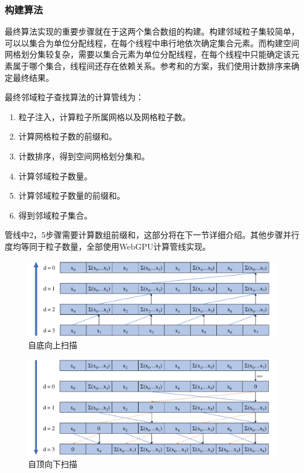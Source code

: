 \subsubsection{构建算法}
    最终算法实现的重要步骤就在于这两个集合数组的构建。构建邻域粒子集较简单，可以以集合为单位分配线程，在每个线程中串行地依次确定集合元素。而构建空间网格划分集较复杂，需要以集合元素为单位分配线程，在每个线程中只能确定该元素属于哪个集合，线程间还存在依赖关系。参考\cite{G10NS}和\cite{RC14NS}的方案，我们使用计数排序来确定最终结果。
    
    最终邻域粒子查找算法的计算管线为：

    \begin{enumerate}
    	\item 粒子注入，计算粒子所属网格以及网格粒子数。
    	\item 计算网格粒子数的前缀和。
    	\item 计数排序，得到空间网格划分集和。
    	\item 计算邻域粒子数量。
    	\item 计算邻域粒子数量的前缀和。
    	\item 得到邻域粒子集合。
    \end{enumerate}

    管线中2，5步骤需要计算数组前缀和，这部分将在下一节详细介绍。其他步骤并行度均等同于粒子数量，全部使用WebGPU计算管线实现。

    \begin{figure}
    	\centering
    	\includegraphics[width=.8\textwidth]{figures/neighbor/up_sweep.pdf}
    	\caption{自底向上扫描}
    	\label{fig:upsweep}
    \end{figure}
    
    \begin{figure}
    	\centering
    	\includegraphics[width=.8\textwidth]{figures/neighbor/down_sweep.pdf}
    	\caption{自顶向下扫描}
    	\label{fig:downsweep}
    \end{figure}

